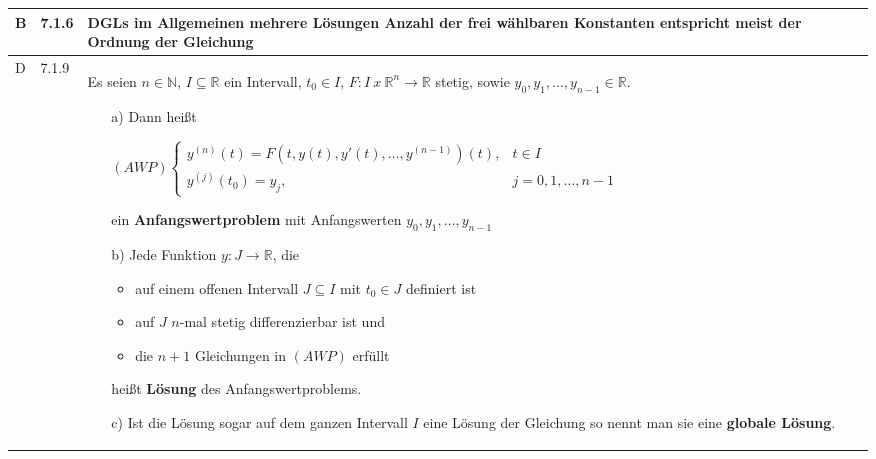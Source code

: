 \begin{longtable}{p{0.75cm} p{1cm} p{16cm}}
        \midrule
        B   & 7.1.6 &   DGLs im Allgemeinen mehrere Lösungen \hfill \break
                        Anzahl der frei wählbaren Konstanten entspricht meist der Ordnung der Gleichung \\
        \midrule
        D   & 7.1.9 &   Es seien $n \in \mathbb{N}$, $I \subseteq \mathbb{R}$ ein Intervall, $t_0 \in I$, $F:I ~x~ \mathbb{R}^n \rightarrow \mathbb{R}$
                        stetig, sowie $y_0, y_1, \dots, y_{n-1} \in \mathbb{R}$.
                        \begin{itemize}[topsep=-0.5cm]
                            \item[a)] Dann heißt \hfill \break
                                        \centerline{$ (AWP) \begin{cases}
                                                            y^{(n)}(t) = F(t,y(t),y'(t), \dots, y^{(n-1)})(t), & t \in I \\
                                                            y^{(j)}(t_0) = y_j, & j = 0,1,\dots, n-1
                                                            \end{cases} $}
                                        ein \textbf{Anfangswertproblem} mit Anfangswerten $y_0,y_1, \dots, y_{n-1}$ 
                            \item[b)] Jede Funktion $y: J \rightarrow \mathbb{R}$, die 
                                        \begin{itemize}
                                            \item auf einem offenen Intervall $J \subseteq I$ mit $t_0 \in J$ definiert ist
                                            \item auf $J$ $n$-mal stetig differenzierbar ist und
                                            \item die $n+1$ Gleichungen in $(AWP)$ erfüllt
                                        \end{itemize}
                                      heißt \textbf{Lösung} des Anfangswertproblems.
                            \item[c)] Ist die Lösung sogar auf dem ganzen Intervall $I$ eine Lösung der Gleichung so nennt man sie eine
                                        \textbf{globale Lösung}.
                        \end{itemize} \vspace{-0cm} \\

        \bottomrule

    \end{longtable}


